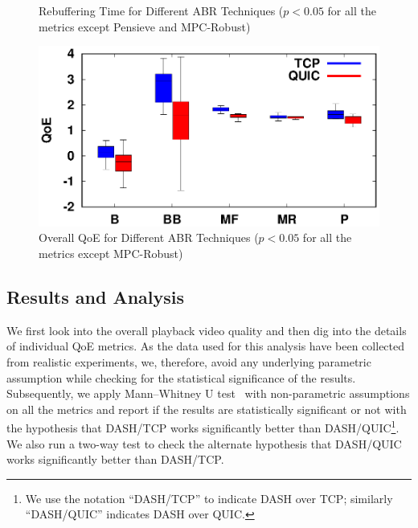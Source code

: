 \begin{figure}[!t]
\begin{minipage}[t]{0.23\linewidth}
		\caption{\label{fig:chap03s2:RebufferTime_n}Rebuffering Time for Different ABR Techniques ($p<0.05$ for all the metrics except Pensieve and MPC-Robust)}
	\end{minipage}\hfill
	\begin{minipage}[t]{0.23\linewidth}
		\includegraphics[width=\linewidth]{img/newexp/qoe_box}
		\caption{\label{fig:chap03s2:QOE_n}Overall QoE for Different ABR Techniques ($p<0.05$ for all the metrics except MPC-Robust)}
	\end{minipage}
\end{figure}

\subsection{Results and Analysis}
We first look into the overall playback video quality and then dig into the details of individual QoE metrics. As the data used for this analysis have been collected from realistic experiments, we, therefore, avoid any underlying parametric assumption while checking for the statistical significance of the results. Subsequently, we apply Mann–Whitney U test~\cite{mannwhitney} with non-parametric assumptions on all the metrics and report if the results are statistically significant or not with the hypothesis that DASH/TCP works significantly better than DASH/QUIC\footnote{We use the notation ``DASH/TCP'' to indicate DASH over TCP; similarly ``DASH/QUIC'' indicates DASH over QUIC.}. We also run a two-way test to check the alternate hypothesis that DASH/QUIC works significantly better than DASH/TCP.




